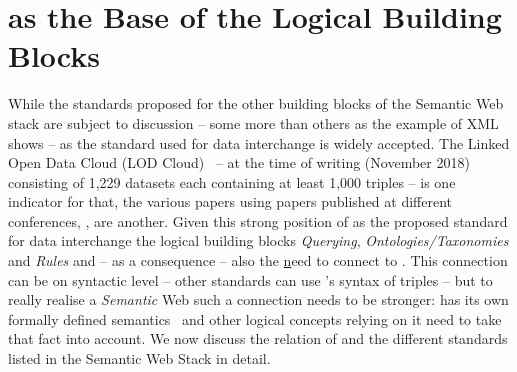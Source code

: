 \section{\rdf as the Base of the Logical Building Blocks}
While the standards proposed for the other building blocks of the Semantic Web stack are subject to discussion -- some more than others as the example of XML shows -- 
\rdf as 
the standard 
used for data interchange is widely accepted. The Linked Open Data Cloud (LOD Cloud)~\cite{LODCloud} -- at the time of writing (November 2018) 
consisting of 1,229 datasets each containing at least 1,000 \rdf triples -- is one indicator for that, the various papers using \rdf papers 
published at different conferences, \eg \cite{iswc,eswc},
are another. 
Given this strong position of \rdf as the proposed standard for data interchange 
the logical building blocks \emph{Querying}, \emph{Ontologies/Taxonomies} and \emph{Rules} and -- as a consequence -- also the
\ul need to connect to \rdf. 
This connection can be on syntactic level -- other standards can use \rdf's syntax of triples -- but to really realise a \emph{Semantic} Web 
such a connection needs to be stronger:
\rdf has its own formally defined semantics~\cite{RDFSemantics} and other logical concepts relying on it need to take that fact into account. 
We now discuss the relation of \rdf and the different standards listed in the Semantic Web Stack in detail.

